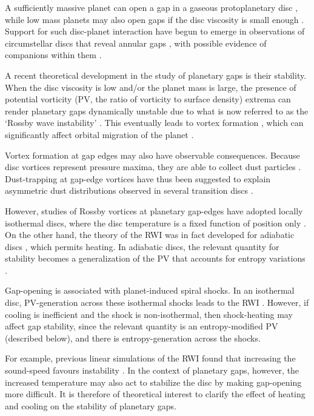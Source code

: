 \documentclass[useAMS,usenatbib]{mn2e}
\begin{document}
A sufficiently massive planet can open a gap in a 
gaseous protoplanetary disc \citep{pap_lin84,bryden99,crida06,fung14}, 
while low mass planets may also open gaps if the disc viscosity is
small enough \citep{li09,dong11,duffell13}. Support for such disc-planet
interaction have begun to emerge in observations of circumstellar
discs that reveal annular gaps
\citep[e.g.][]{quanz13a,debes13,osorio14}, with possible evidence of
companions within them \citep[e.g.][]{quanz13b,reggiani14}. 

A recent theoretical development in the study of planetary gaps is
their stability. When the disc viscosity is low and/or the planet mass
is large, the presence of potential vorticity (PV, the ratio of
vorticity to surface density) extrema can render planetary gaps
dynamically unstable due to what is now referred to as the `Rossby
wave instability' \citep[RWI,][]{lovelace99,li00}. This 
eventually leads to vortex formation 
\citep{li01,koller03,li05,valborro07}, which can significantly affect
orbital migration of the planet  \citep{ou07,li09,yu10,lin10}. 

Vortex formation at gap edges may also have observable 
consequences. Because disc vortices represent pressure maxima, they are
able to collect dust particles 
\citep{barge95,inaba06,lyra13}. Dust-trapping at gap-edge vortices
have thus been suggested to explain asymmetric dust
distributions observed in several transition discs
\citep[e.g][]{marel13,isella13,perez14}. 

However, studies of Rossby vortices at planetary gap-edges have 
adopted locally isothermal discs, 
where the disc temperature is a fixed function of
position only \citep[e.g.][]{lyra08,lin11a,zhu14,fu14}. On the other hand, the theory of the RWI was in fact
developed for adiabatic discs \citep{li00}, which permits
heating. 
In adiabatic discs, the relevant quantity for stability
becomes a generalization of the PV that accounts for entropy variations
\citep{lovelace99}.   


Gap-opening is associated with planet-induced spiral shocks. In an
isothermal disc, PV-generation across these isothermal shocks leads to
the RWI \citep{koller03,li05,valborro07,lin10}.    
However, if cooling is inefficient and the shock is non-isothermal,
then shock-heating may affect gap stability, since the
relevant quantity is an entropy-modified PV (described below), and
there is entropy-generation across the shocks. 

For example, previous
linear simulations of the RWI found  
that increasing the sound-speed favours instability \citep{li00,lin13}.  
In the context of
planetary gaps, however, the increased temperature may also act to
stabilize the disc by making gap-opening more difficult. It is 
therefore of theoretical interest to clarify the effect of heating and
cooling on the stability of planetary gaps. 
\end{document}
